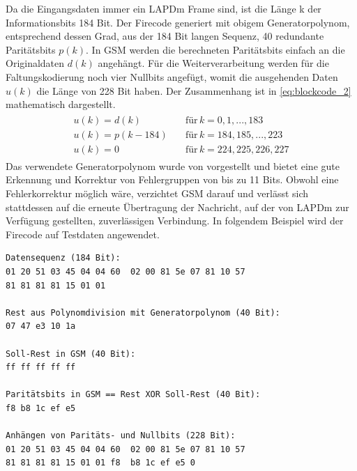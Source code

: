 Da die Eingangsdaten immer ein \ac{LAPDm} Frame sind, ist die Länge k der Informationsbits 184 Bit. Der Firecode generiert mit obigem Generatorpolynom, entsprechend dessen Grad, aus der 184 Bit langen Sequenz, 40 redundante Paritätsbits $p(k)$. In \ac{GSM} werden die berechneten Paritätsbits einfach an die Originaldaten $d(k)$ angehängt. Für die Weiterverarbeitung werden für die Faltungskodierung noch vier Nullbits angefügt, womit die ausgehenden Daten $u(k)$ die Länge von 228 Bit haben. Der Zusammenhang ist in  \autoref{eq:blockcode_2} mathematisch dargestellt.
\begin{align}\label{eq:blockcode_2}
\begin{split}
u(k) = d(k) &\quad \text{für} \, k= 0,1,...,183 \\
u(k) = p(k-184) &\quad \text{für} \, k = 184,185,...,223 \\
u(k) = 0 &\quad \text{für} \, k = 224,225,226,227
\end{split}
\end{align}
Das verwendete Generatorpolynom wurde von \citet{fire1959class} vorgestellt und bietet eine gute Erkennung und Korrektur von Fehlergruppen von bis zu 11 Bits. Obwohl eine Fehlerkorrektur möglich wäre, verzichtet \ac{GSM} darauf und verlässt sich stattdessen auf die erneute Übertragung der Nachricht, auf der von \ac{LAPDm} zur Verfügung gestellten, zuverlässigen Verbindung. In folgendem Beispiel wird der Firecode auf Testdaten angewendet.\\

\begin{lstlisting}[caption={[Kodierung von Testdaten mit dem Firecodes]Kodierung von Testdaten mit dem Firecodes, Datensatz generiert mit \texttt{dummycoder} (siehe \autoref{hdl:coder-impl})}, captionpos=b, language=bytetxt, numbers=none, frame=single]
Datensequenz (184 Bit):
01 20 51 03 45 04 04 60  02 00 81 5e 07 81 10 57 
81 81 81 81 15 01 01

Rest aus Polynomdivision mit Generatorpolynom (40 Bit): 
07 47 e3 10 1a

Soll-Rest in GSM (40 Bit):
ff ff ff ff ff

Paritätsbits in GSM == Rest XOR Soll-Rest (40 Bit):
f8 b8 1c ef e5

Anhängen von Paritäts- und Nullbits (228 Bit):
01 20 51 03 45 04 04 60  02 00 81 5e 07 81 10 57 
81 81 81 81 15 01 01 f8  b8 1c ef e5 0
\end{lstlisting}

